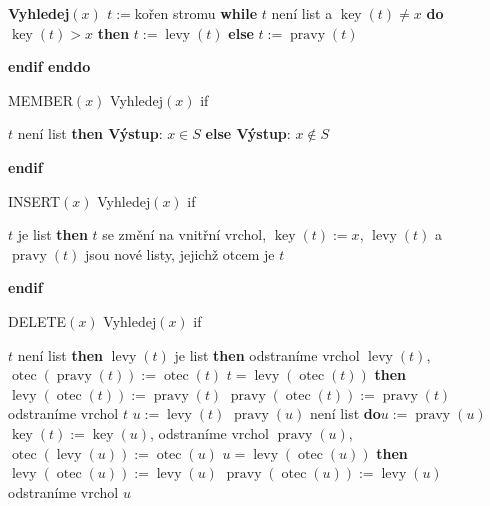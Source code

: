 \documentclass[a4paper,12pt]{article}
\DeclareMathOperator*{\otec}{otec}
\DeclareMathOperator*{\levy}{levy}
\DeclareMathOperator*{\pravy}{pravy}
\DeclareMathOperator*{\key}{key}
\begin{document}
{\bf Vyhledej$(x)$\newline 
$t:=$}kořen stromu\newline 
{\bf while} $t$ není list a $\key(t)\ne x$ {\bf do}\newline 
\phantom{---}{\bf if} $\key(t)>x$ {\bf then} $t:=\levy(t)$ {\bf else} $t:=\pravy(t)$ {\bf endif\newline 
enddo

MEMBER$(x)$\newline 
Vyhledej$(x)$\newline 
if} $t$ není list {\bf then Výstup}: $x\in S$ {\bf else Výstup}: $
x\notin S$ {\bf endif

INSERT$(x)$\newline 
Vyhledej$(x)$\newline 
if} $t$ je list {\bf then}\newline 
$t$ se změní na vnitřní vrchol, $\key(t):=x$,\newline 
$\levy(t)$ a $\pravy(t)$ jsou nové listy, jejichž otcem je $t$\newline 
{\bf endif

DELETE$(x)$\newline 
Vyhledej$(x)$\newline 
if} $t$ není list {\bf then}\newline 
\phantom{---}{\bf if} $\levy(t)$ je list {\bf then\newline}
\phantom{------}odstraníme vrchol $\levy(t)$, $\otec(\pravy(t)):=\otec(t)$\newline 
\phantom{------}{\bf if} $t=\levy(\otec(t))$ {\bf then}\newline
\phantom{---------}$\levy(\otec(t)):=\pravy(t)$\newline 
\phantom{------}{\bf else}\newline 
\phantom{---------}$\pravy(\otec(t)):=\pravy(t)$\newline 
\phantom{------}{\bf endif\newline}
\phantom{------}odstraníme vrchol $t$\newline 
\phantom{---}{\bf else}\newline 
\phantom{------}$u:=\levy(t)$\newline 
\phantom{------}{\bf while} $\pravy(u)$ není list {\bf do}\newline \phantom{---------}$u:=\pravy(u)$\newline 
\phantom{------}{\bf enddo}\newline 
\phantom{------}$\key(t):=\key(u)$, odstraníme vrchol $\pravy(u)$,\newline 
\phantom{------}$\otec(\levy(u)):=\otec(u)$\newline 
\phantom{------}{\bf if} $u=\levy(\otec(u))$ {\bf then}\newline 
\phantom{---------}$\levy(\otec(u)):=\levy(u)$\newline 
\phantom{------}{\bf else}\newline 
\phantom{---------}$\pravy(\otec(u)):=\levy(u)$\newline 
\phantom{------}{\bf endif\newline}
\phantom{------}odstraníme vrchol $u$\newline 
\phantom{---}{\bf endif\newline 
endif}
\end{document}
